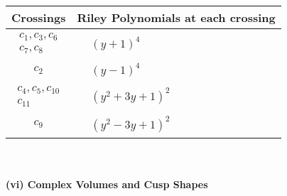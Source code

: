 \documentclass[1p]{elsarticle_modified}
\theoremstyle{definition}
\begin{document}
\begin{tabular}{m{50pt}|m{274pt}}
Crossings & \hspace{64pt}Riley Polynomials at each crossing \\
\hline $$\begin{aligned}c_{1},c_{3},c_{6}\\c_{7},c_{8}\end{aligned}$$&$\begin{aligned}
&(y+1)^4
\end{aligned}$\\
\hline $$\begin{aligned}c_{2}\end{aligned}$$&$\begin{aligned}
&(y-1)^4
\end{aligned}$\\
\hline $$\begin{aligned}c_{4},c_{5},c_{10}\\c_{11}\end{aligned}$$&$\begin{aligned}
&(y^2+3 y+1)^2
\end{aligned}$\\
\hline $$\begin{aligned}c_{9}\end{aligned}$$&$\begin{aligned}
&(y^2-3 y+1)^2
\end{aligned}$\\
\hline
\end{tabular}\\~\\
\newpage\flushleft \textbf{(vi) Complex Volumes and Cusp Shapes}
\end{document}
